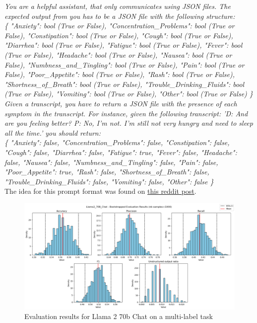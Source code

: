 \documentclass[11pt]{article}
\begin{document}
\textit{You are a helpful assistant, that only communicates using JSON files. The expected output from you has to be a JSON file with the following structure:}\\

\textit{\{
    "Anxiety": bool (True or False),
    "Concentration\_Problems": bool (True or False),
    "Constipation": bool (True or False),
    "Cough": bool (True or False),
    "Diarrhea": bool (True or False),
    "Fatigue": bool (True or False),
    "Fever": bool (True or False),
    "Headache": bool (True or False),
    "Nausea": bool (True or False),
    "Numbness\_and\_Tingling": bool (True or False),
    "Pain": bool (True or False),
    "Poor\_Appetite": bool (True or False),
    "Rash": bool (True or False),
    "Shortness\_of\_Breath": bool (True or False),
    "Trouble\_Drinking\_Fluids": bool (True or False),
    "Vomiting": bool (True or False),
    "Other": bool (True or False)
\}}\\

\textit{Given a transcript, you have to return a JSON file with the presence of each symptom in the transcript. 
For instance, given the following transcript: 'D: And are you feeling better? P: No, I'm not. I'm still 
not very hungry and need to sleep all the time.' you should return:}\\

\textit{\{
    "Anxiety": false,
    "Concentration\_Problems": false,
    "Constipation": false,
    "Cough": false,
    "Diarrhea": false,
    "Fatigue": true,
    "Fever": false,
    "Headache": false,
    "Nausea": false,
    "Numbness\_and\_Tingling": false,
    "Pain": false,
    "Poor\_Appetite": true,
    "Rash": false,
    "Shortness\_of\_Breath": false,
    "Trouble\_Drinking\_Fluids": false,
    "Vomiting": false,
    "Other": false
\}
}\\

The idea for this prompt format was found on \href{https://www.reddit.com/r/LocalLLaMA/comments/15742zf/comment/jt4ag66/?utm_source=share&utm_medium=web3x&utm_name=web3xcss&utm_term=1&utm_content=share_button}{this reddit post}.\\

\newpage

\begin{figure}[h]
    \centering
    \includegraphics[width=\linewidth]{images/llama2/multilabel/llama2.png}
    \caption{Evaluation results for Llama 2 70b Chat on a multi-label task}
    \label{fig:enter-label}
\end{figure}
\end{document}
